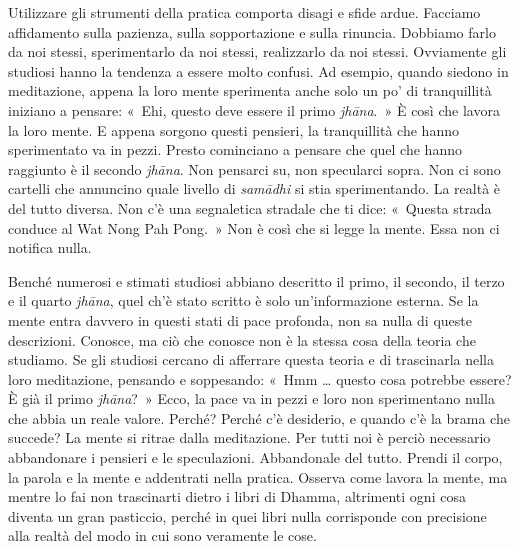 Utilizzare gli strumenti della pratica comporta disagi e sfide ardue.
Facciamo affidamento sulla pazienza, sulla sopportazione e sulla
rinuncia. Dobbiamo farlo da noi stessi, sperimentarlo da noi stessi,
realizzarlo da noi stessi. Ovviamente gli studiosi hanno la tendenza a
essere molto confusi. Ad esempio, quando siedono in meditazione, appena
la loro mente sperimenta anche solo un po' di tranquillità iniziano a
pensare: «~Ehi, questo deve essere il primo \emph{jhāna}.~» È così che
lavora la loro mente. E appena sorgono questi pensieri, la tranquillità
che hanno sperimentato va in pezzi. Presto cominciano a pensare che quel
che hanno raggiunto è il secondo \emph{jhāna}. Non pensarci su, non
specularci sopra. Non ci sono cartelli che annuncino quale livello di
\emph{samādhi} si stia sperimentando. La realtà è del tutto diversa. Non
c'è una segnaletica stradale che ti dice: «~Questa strada conduce al Wat
Nong Pah Pong.~» Non è così che si legge la mente. Essa non ci notifica
nulla.

Benché numerosi e stimati studiosi abbiano descritto il primo, il
secondo, il terzo e il quarto \emph{jhāna}, quel ch'è stato scritto è
solo un'informazione esterna. Se la mente entra davvero in questi stati
di pace profonda, non sa nulla di queste descrizioni. Conosce, ma ciò
che conosce non è la stessa cosa della teoria che studiamo. Se gli
studiosi cercano di afferrare questa teoria e di trascinarla nella loro
meditazione, pensando e soppesando: «~Hmm \ldots{} questo cosa potrebbe
essere? È già il primo \emph{jhāna}?~» Ecco, la pace va in pezzi e loro
non sperimentano nulla che abbia un reale valore. Perché? Perché c'è
desiderio, e quando c'è la brama che succede? La mente si ritrae dalla
meditazione. Per tutti noi è perciò necessario abbandonare i pensieri e
le speculazioni. Abbandonale del tutto. Prendi il corpo, la parola e la
mente e addentrati nella pratica. Osserva come lavora la mente, ma
mentre lo fai non trascinarti dietro i libri di Dhamma, altrimenti ogni
cosa diventa un gran pasticcio, perché in quei libri nulla corrisponde
con precisione alla realtà del modo in cui sono veramente le cose.

